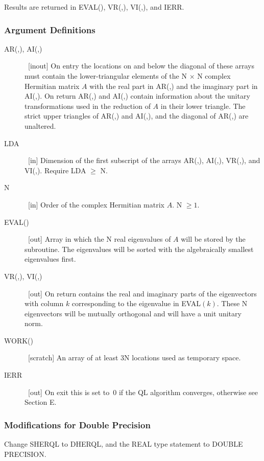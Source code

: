 \documentclass[twoside]{MATH77}
\begin{document}
Results are returned in EVAL(), VR(,), VI(,), and IERR.

\subsubsection{Argument Definitions}

\begin{description}
\item[AR(,), AI(,)]  \ [inout] On entry the locations on and below the
diagonal of these arrays must contain the lower-triangular elements of the
N $\times $ N complex Hermitian matrix $A$ with the real part in AR(,) and
the imaginary part in AI(,). On return AR(,) and AI(,) contain information
about the unitary transformations used in the reduction of $A$ in their lower
triangle. The strict upper triangles of AR(,) and AI(,), and the diagonal of
AR(,) are unaltered.

\item[LDA]  \ [in] Dimension of the first subscript of the arrays AR(,),
AI(,), VR(,), and VI(,). Require LDA $\geq $ N.

\item[N]  \ [in] Order of the complex Hermitian matrix $A$. N $\geq 1.$

\item[EVAL()]  \ [out] Array in which the N real eigenvalues of $A$ will be
stored by the subroutine. The eigenvalues will be sorted with the
algebraically smallest eigenvalues first.

\item[VR(,), VI(,)]  \ [out] On return contains the real and imaginary parts
of the eigenvectors with column $k$ corresponding to the eigenvalue in EVAL$%
(k)$. These N eigenvectors will be mutually orthogonal and will have a
unit unitary norm.

\item[WORK()]  \ [scratch] An array of at least 3N locations used as
temporary space.

\item[IERR]  \ [out] On exit this is set to~0 if the QL algorithm converges,
otherwise see Section E.
\end{description}

\subsubsection{Modifications for Double Precision}

Change SHERQL to DHERQL, and the REAL type statement to DOUBLE PRECISION.
\end{document}
